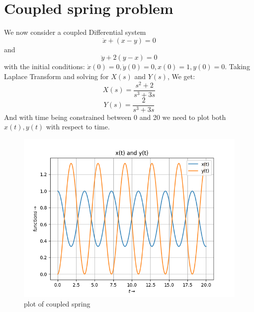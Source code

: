 \documentclass[11pt, a4paper]{article}
\begin{document}
\section{Coupled spring problem}
We now consider a coupled Differential system
\begin{equation}
    \ddot x + (x-y) = 0
\end{equation}
and 
\begin{equation}
    \ddot y + 2(y-x) = 0
\end{equation}
with the initial conditions: $\dot x(0) =0,\dot y(0) =0,x(0) =1,y(0) =0$.
Taking Laplace Transform and solving for $X(s)$ and $Y(s)$, We get:
\begin{equation}
    X(s) = \frac{s^2+2}{s^3 + 3s}
\end{equation}
\begin{equation}
    Y(s) = \frac{2}{s^3 + 3s}
\end{equation}
And with time being constrained between 0 and 20 we need to plot both $x(t),y(t)$ with respect to time.
\begin{figure}[!tbh]
    \centering
    \includegraphics[scale=0.5]{coupled_spring.png}  
    \caption{plot of coupled spring} 
    \label{fig:fig4}
\end{figure}
\pagebreak
\newpage
\end{document}
